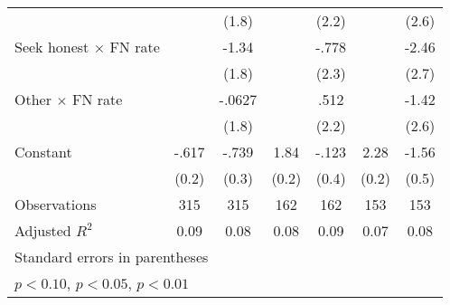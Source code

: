\begin{table}[htbp]
\begin{tabular}{l*{6}{c}}
                &                  &    (1.8)         &                  &    (2.2)         &                  &    (2.6)         \\
Seek honest $\times$ FN rate&                  &    -1.34         &                  &    -.778         &                  &    -2.46         \\
                &                  &    (1.8)         &                  &    (2.3)         &                  &    (2.7)         \\
Other $\times$ FN rate&                  &   -.0627         &                  &     .512         &                  &    -1.42         \\
                &                  &    (1.8)         &                  &    (2.2)         &                  &    (2.6)         \\
Constant        &    -.617\sym{***}&    -.739\sym{**} &     1.84\sym{***}&    -.123         &     2.28\sym{***}&    -1.56\sym{***}\\
                &    (0.2)         &    (0.3)         &    (0.2)         &    (0.4)         &    (0.2)         &    (0.5)         \\
\hline
Observations    &      315         &      315         &      162         &      162         &      153         &      153         \\
Adjusted \(R^{2}\)&     0.09         &     0.08         &     0.08         &     0.09         &     0.07         &     0.08         \\
\hline\hline
\multicolumn{7}{l}{\footnotesize Standard errors in parentheses}\\
\multicolumn{7}{l}{\footnotesize \sym{*} \(p<0.10\), \sym{**} \(p<0.05\), \sym{***} \(p<0.01\)}\\
\end{tabular}
\end{table}
